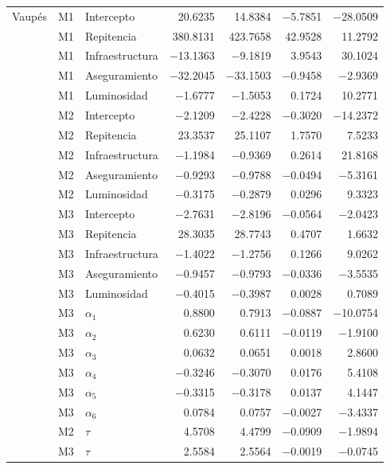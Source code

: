 \begin{longtable}{l c l r r r r}
\hline

Vaupés & M1 & Intercepto & \num{20.6235} & \num{14.8384} & \num{-5.7851} & \num{-28.0509} \\
 & M1 & Repitencia & \num{380.8131} & \num{423.7658} & \num{42.9528} & \num{11.2792} \\
 & M1 & Infraestructura & \num{-13.1363} & \num{-9.1819} & \num{3.9543} & \num{30.1024} \\
 & M1 & Aseguramiento & \num{-32.2045} & \num{-33.1503} & \num{-0.9458} & \num{-2.9369} \\
 & M1 & Luminosidad & \num{-1.6777} & \num{-1.5053} & \num{0.1724} & \num{10.2771} \\
 & M2 & Intercepto & \num{-2.1209} & \num{-2.4228} & \num{-0.3020} & \num{-14.2372} \\
 & M2 & Repitencia & \num{23.3537} & \num{25.1107} & \num{1.7570} & \num{7.5233} \\
 & M2 & Infraestructura & \num{-1.1984} & \num{-0.9369} & \num{0.2614} & \num{21.8168} \\
 & M2 & Aseguramiento & \num{-0.9293} & \num{-0.9788} & \num{-0.0494} & \num{-5.3161} \\
 & M2 & Luminosidad & \num{-0.3175} & \num{-0.2879} & \num{0.0296} & \num{9.3323} \\
 & M3 & Intercepto & \num{-2.7631} & \num{-2.8196} & \num{-0.0564} & \num{-2.0423} \\
 & M3 & Repitencia & \num{28.3035} & \num{28.7743} & \num{0.4707} & \num{1.6632} \\
 & M3 & Infraestructura & \num{-1.4022} & \num{-1.2756} & \num{0.1266} & \num{9.0262} \\
 & M3 & Aseguramiento & \num{-0.9457} & \num{-0.9793} & \num{-0.0336} & \num{-3.5535} \\
 & M3 & Luminosidad & \num{-0.4015} & \num{-0.3987} & \num{0.0028} & \num{0.7089} \\
 & M3 & $\alpha_{1}$ & \num{0.8800} & \num{0.7913} & \num{-0.0887} & \num{-10.0754} \\
 & M3 & $\alpha_{2}$ & \num{0.6230} & \num{0.6111} & \num{-0.0119} & \num{-1.9100} \\
 & M3 & $\alpha_{3}$ & \num{0.0632} & \num{0.0651} & \num{0.0018} & \num{2.8600} \\
 & M3 & $\alpha_{4}$ & \num{-0.3246} & \num{-0.3070} & \num{0.0176} & \num{5.4108} \\
 & M3 & $\alpha_{5}$ & \num{-0.3315} & \num{-0.3178} & \num{0.0137} & \num{4.1447} \\
 & M3 & $\alpha_{6}$ & \num{0.0784} & \num{0.0757} & \num{-0.0027} & \num{-3.4337} \\
 & M2 & $\tau$ & \num{4.5708} & \num{4.4799} & \num{-0.0909} & \num{-1.9894} \\
 & M3 & $\tau$ & \num{2.5584} & \num{2.5564} & \num{-0.0019} & \num{-0.0745} \\

\hline
\end{longtable}
\endgroup

